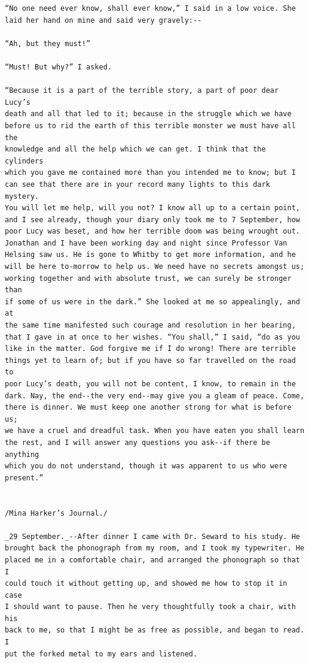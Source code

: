 \documentclass{article}
\begin{document}
\begin{verbatim}
“No one need ever know, shall ever know,” I said in a low voice. She
laid her hand on mine and said very gravely:--

“Ah, but they must!”

“Must! But why?” I asked.

“Because it is a part of the terrible story, a part of poor dear Lucy’s
death and all that led to it; because in the struggle which we have
before us to rid the earth of this terrible monster we must have all the
knowledge and all the help which we can get. I think that the cylinders
which you gave me contained more than you intended me to know; but I
can see that there are in your record many lights to this dark mystery.
You will let me help, will you not? I know all up to a certain point,
and I see already, though your diary only took me to 7 September, how
poor Lucy was beset, and how her terrible doom was being wrought out.
Jonathan and I have been working day and night since Professor Van
Helsing saw us. He is gone to Whitby to get more information, and he
will be here to-morrow to help us. We need have no secrets amongst us;
working together and with absolute trust, we can surely be stronger than
if some of us were in the dark.” She looked at me so appealingly, and at
the same time manifested such courage and resolution in her bearing,
that I gave in at once to her wishes. “You shall,” I said, “do as you
like in the matter. God forgive me if I do wrong! There are terrible
things yet to learn of; but if you have so far travelled on the road to
poor Lucy’s death, you will not be content, I know, to remain in the
dark. Nay, the end--the very end--may give you a gleam of peace. Come,
there is dinner. We must keep one another strong for what is before us;
we have a cruel and dreadful task. When you have eaten you shall learn
the rest, and I will answer any questions you ask--if there be anything
which you do not understand, though it was apparent to us who were
present.”


/Mina Harker’s Journal./

_29 September._--After dinner I came with Dr. Seward to his study. He
brought back the phonograph from my room, and I took my typewriter. He
placed me in a comfortable chair, and arranged the phonograph so that I
could touch it without getting up, and showed me how to stop it in case
I should want to pause. Then he very thoughtfully took a chair, with his
back to me, so that I might be as free as possible, and began to read. I
put the forked metal to my ears and listened.


\end{verbatim}
\end{document}
